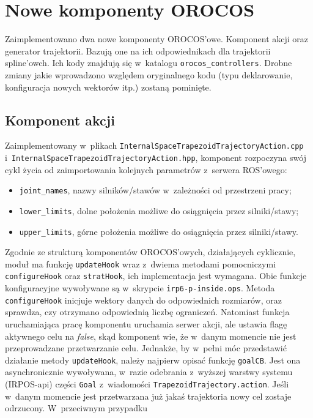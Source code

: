 \documentclass[a4paper, 12pt]{article}
\begin{document}
	\section{Nowe komponenty OROCOS}
	Zaimplementowano dwa nowe komponenty OROCOS'owe. Komponent akcji oraz generator trajektorii. Bazują one na ich odpowiednikach dla trajektorii spline'owch. Ich kody znajdują się w~katalogu \texttt{orocos\_controllers}. Drobne zmiany jakie wprowadzono względem oryginalnego kodu (typu deklarowanie, konfiguracja nowych wektorów itp.) zostaną pominięte.
	
	\subsection{Komponent akcji}
	Zaimplementowany w~plikach \texttt{InternalSpaceTrapezoidTrajectoryAction.cpp} \linebreak i~\texttt{InternalSpaceTrapezoidTrajectoryAction.hpp}, komponent rozpoczyna swój cykl życia od zaimportowania kolejnych parametrów z~serwera ROS'owego:
	\begin{itemize}
	\item \texttt{joint\_names}, nazwy silników/stawów w~zależności od przestrzeni pracy;
	\item \texttt{lower\_limits}, dolne położenia możliwe do osiągnięcia przez silniki/stawy;
	\item \texttt{upper\_limits}, górne położenia możliwe do osiągnięcia przez silniki/stawy.
	\end{itemize}
	Zgodnie ze strukturą komponentów OROCOS'owych, działających cyklicznie, moduł ma funkcję \texttt{updateHook} wraz z~dwiema metodami pomocniczymi \texttt{configureHook} oraz \texttt{stratHook}, ich implementacja jest wymagana\cite{orocosbuild}. Obie funkcje konfiguracyjne wywoływane są w~skrypcie \texttt{irp6-p-inside.ops}. Metoda \texttt{configureHook} inicjuje wektory danych do odpowiednich rozmiarów, oraz sprawdza, czy otrzymano odpowiednią liczbę ograniczeń. Natomiast funkcja uruchamiająca pracę komponentu uruchamia serwer akcji, ale ustawia flagę aktywnego celu na \textit{false}, skąd komponent wie, że w~danym momencie nie jest przeprowadzane przetwarzanie celu. Jednakże, by w~pełni móc przedstawić działanie metody \texttt{updateHook}, należy najpierw opisać funkcję \texttt{goalCB}. Jest ona asynchronicznie wywoływana, w~razie odebrania z~wyższej warstwy systemu (IRPOS-api) części \texttt{Goal} z~wiadomości \texttt{TrapezoidTrajectory.action}. Jeśli w~danym momencie jest przetwarzana już jakaś trajektoria nowy cel zostaje odrzucony. W~przeciwnym przypadku 
\end{document}
